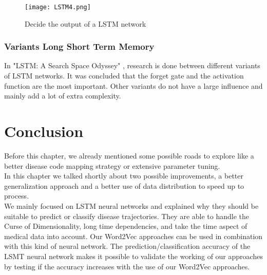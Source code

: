 \begin{figure}[!htb]
	\centering
	\texttt{[image: LSTM4.png]}
	\caption{Decide the output of a LSTM network \cite{lstmGood:online}}
	\label{fig:LSTM4}
\end{figure} 


\subsubsection{Variants Long Short Term Memory}

In "LSTM: A Search Space Odyssey" \cite{lstmSpace:article}, research is done between different variants of LSTM networks. It was concluded that the forget gate and the activation function are the most important. Other variants do not have a large influence and mainly add a lot of extra complexity.


\section{Conclusion}

Before this chapter, we already mentioned some possible roads to explore like a better disease code mapping strategy or extensive parameter tuning. \\

In this chapter we talked shortly about two possible improvements, a better generalization approach and a better use of data distribution to speed up to process. \\
We mainly focused on LSTM neural networks and explained why they should be suitable to predict or classify disease trajectories. They are able to handle the Curse of Dimensionality, long time dependencies, and take the time aspect of medical data into account. Our Word2Vec approaches can be used in combination with this kind of neural network. The prediction/classification accuracy of the LSMT neural network makes it possible to validate the working of our approaches by testing if the accuracy increases with the use of our Word2Vec approaches. \\


